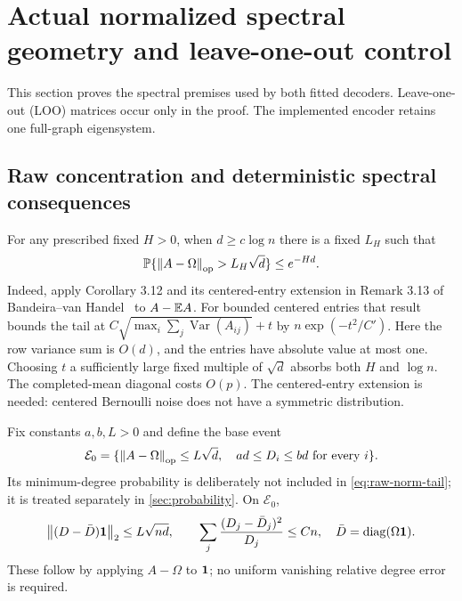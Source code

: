 \section{Actual normalized spectral geometry and leave-one-out control}
\label{sec:geometry}

This section proves the spectral premises used by both fitted decoders.
Leave-one-out (LOO) matrices occur only in the proof. The implemented
encoder retains one full-graph eigensystem.

\subsection{Raw concentration and deterministic spectral consequences}

For any prescribed fixed $H>0$, when $d\ge c\log n$ there is a fixed
$L_H$ such that
\begin{equation}\label{eq:raw-norm-tail}
 \mathbb P\{\left\lVert A-\Omega\right\rVert_{\mathrm{op}}>L_H\sqrt d\}\le e^{-Hd}.
\end{equation}
Indeed, apply Corollary 3.12 and its centered-entry extension in
Remark 3.13 of Bandeira--van Handel~\cite{bvh} to $A-\mathbb E A$.
For bounded centered entries that result bounds the tail at
$C\sqrt{\max_i\sum_j\operatorname{Var}(A_{ij})}+t$ by
$n\exp(-t^2/C')$. Here the row variance sum is $O(d)$, and the entries
have absolute value at most one. Choosing $t$ a sufficiently large fixed
multiple of $\sqrt d$ absorbs both $H$ and $\log n$.
The completed-mean diagonal costs $O(p)$. The centered-entry extension is
needed: centered Bernoulli noise does not have a symmetric distribution.

Fix constants $a,b,L>0$ and define the base event
\begin{equation}\label{eq:base-event}
 \mathcal E_0=
 \{\left\lVert A-\Omega\right\rVert_{\mathrm{op}}\le L\sqrt d,
       \quad ad\le D_i\le bd\text{ for every }i\}.
\end{equation}
Its minimum-degree probability is deliberately not included in
\eqref{eq:raw-norm-tail}; it is treated separately in
\cref{sec:probability}.
On $\mathcal E_0$,
\begin{equation}\label{eq:degree-aggregate}
 \left\lVert(D-\bar D)\mathbf 1\right\rVert_2\le L\sqrt{nd},\qquad
 \sum_j\frac{(D_j-\bar D_j)^2}{D_j}\le Cn,
 \quad \bar D=\operatorname{diag}(\Omega\mathbf 1).
\end{equation}
These follow by applying $A-\Omega$ to $\mathbf 1$; no uniform vanishing
relative degree error is required.

